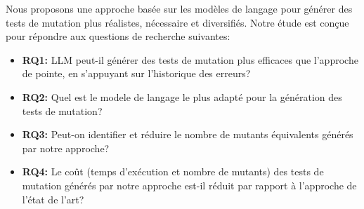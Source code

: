 Nous proposons une approche basée sur les modèles
de langage pour générer des tests de mutation plus réalistes, nécessaire et
diversifiés. Notre étude est conçue pour répondre aux questions de
recherche suivantes:

\begin{itemize}
    \item \textbf{RQ1:} LLM peut-il générer des tests de mutation plus efficaces que l'approche de pointe, en s'appuyant sur l'historique des erreurs?

    \item \textbf{RQ2:} Quel est le modele de langage le plus adapté pour la génération des tests de mutation?

    \item \textbf{RQ3:} Peut-on identifier et réduire le nombre de mutants équivalents générés par notre approche?

    \item \textbf{RQ4:} Le coût (temps d'exécution et nombre de mutants) des tests de mutation générés par notre approche est-il réduit par rapport à l'approche de l'état de l'art?

\end{itemize}

